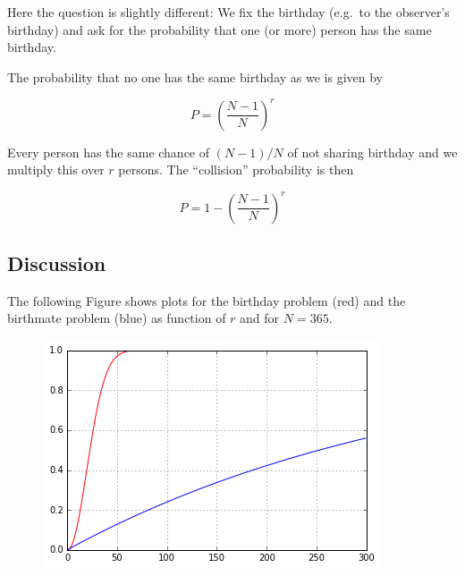 Here the question is slightly different: We fix the birthday (e.g.~to the observer's birthday) and ask for the probability that one (or more) person has the same birthday.

The probability that no one has the same birthday as we is given by

\[
P = \left( \frac{N-1}{N} \right)^r
\]

Every person has the same chance of \((N-1)/N\) of not sharing birthday and we multiply this over \(r\) persons. The ``collision'' probability is then

\[
P = 1 - \left( \frac{N-1}{N} \right)^r
\]

\subsection{Discussion}

The following Figure shows plots for the birthday problem (red) and the birthmate problem (blue) as function of \(r\) and for \(N=365\).

\begin{figure}[H]
\centering
\includegraphics{images/birthday_problem_1.png}
\end{figure}
